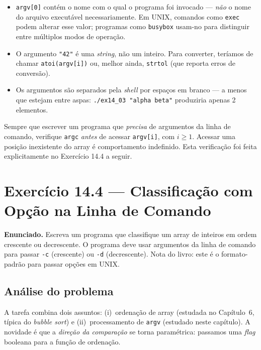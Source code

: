 \documentclass[11pt,a4paper]{article}
\begin{document}
\begin{itemize}[leftmargin=*]
  \item \texttt{argv[0]} cont\'em o nome com o qual o programa foi invocado --- \emph{n\~ao} o nome do arquivo execut\'avel necessariamente. Em UNIX, comandos como \texttt{exec} podem alterar esse valor; programas como \texttt{busybox} usam-no para distinguir entre m\'ultiplos modos de opera\c{c}\~ao.
  \item O argumento \texttt{"42"} \'e uma \emph{string}, n\~ao um inteiro. Para converter, ter\'iamos de chamar \texttt{atoi(argv[i])} ou, melhor ainda, \texttt{strtol} (que reporta erros de convers\~ao).
  \item Os argumentos s\~ao separados pela \emph{shell} por espa\c{c}os em branco --- a menos que estejam entre aspas: \texttt{./ex14\_03 "alpha beta"} produziria apenas 2 elementos.
\end{itemize}

\begin{boaprat}
Sempre que escrever um programa que \emph{precisa} de argumentos da linha de comando, verifique \texttt{argc} \emph{antes} de acessar \texttt{argv[i]}, com $i \geq 1$. Acessar uma posi\c{c}\~ao inexistente do array \'e comportamento indefinido. Esta verifica\c{c}\~ao foi feita explicitamente no Exerc\'icio 14.4 a seguir.
\end{boaprat}

\section{Exerc\'icio 14.4 --- Classifica\c{c}\~ao com Op\c{c}\~ao na Linha de Comando}

\begin{enunciado}
\textbf{Enunciado.} Escreva um programa que classifique um array de inteiros em ordem crescente ou decrescente. O programa deve usar argumentos da linha de comando para passar \texttt{-c} (crescente) ou \texttt{-d} (decrescente). Nota do livro: este \'e o formato-padr\~ao para passar op\c{c}\~oes em UNIX.
\end{enunciado}

\subsection*{An\'alise do problema}

A tarefa combina dois assuntos: (i)~ordena\c{c}\~ao de array (estudada no Cap\'itulo~6, t\'ipica do \emph{bubble sort}) e (ii)~processamento de \texttt{argv} (estudado neste cap\'itulo). A novidade \'e que a \emph{dire\c{c}\~ao da compara\c{c}\~ao} se torna param\'etrica: passamos uma \emph{flag} booleana para a fun\c{c}\~ao de ordena\c{c}\~ao.
\end{document}
